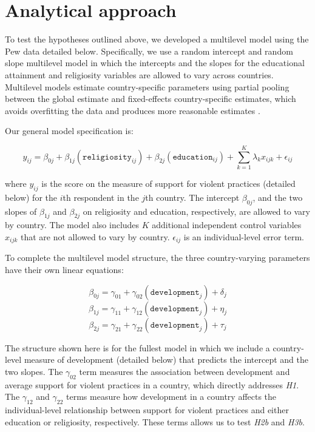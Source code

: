 \documentclass[10pt,letterpaper]{article}
\begin{document}
\section*{Analytical approach}

To test the hypotheses outlined above, we developed a multilevel model using the Pew data detailed below. Specifically, we use a random intercept and random slope multilevel model in which the intercepts and the slopes for the educational attainment and religiosity variables are allowed to vary across countries. Multilevel models estimate country-specific parameters using partial pooling between the global estimate and fixed-effects country-specific estimates, which avoids overfitting the data and produces more reasonable estimates \cite{gelman_multilevel_2006}.

Our general model specification is:

\[y_{ij}=\beta_{0j}+\beta_{1j}(\texttt{religiosity}_{ij})+\beta_{2j}(\texttt{education}_{ij})+\sum_{k=1}^K \lambda_kx_{ijk}+\epsilon_{ij}\]

where \(y_{ij}\) is the score on the measure of support for violent practices (detailed below) for the \(i\)th respondent in the \(j\)th country. The intercept \(\beta_{0j}\), and the two slopes of \(\beta_{1j}\) and \(\beta_{2j}\) on religiosity and education, respectively, are allowed to vary by country. The model also includes \(K\) additional independent control variables \(x_{ijk}\) that are not allowed to vary by country. \(\epsilon_{ij}\) is an individual-level error term.

To complete the multilevel model structure, the three country-varying parameters have their own linear equations:

\[\beta_{0j}=\gamma_{01}+\gamma_{02}(\texttt{development}_j)+\delta_j\]
\[\beta_{1j}=\gamma_{11}+\gamma_{12}(\texttt{development}_j)+\eta_j\]
\[\beta_{2j}=\gamma_{21}+\gamma_{22}(\texttt{development}_j)+\tau_j\]

The structure shown here is for the fullest model in which we include a country-level measure of development (detailed below) that predicts the intercept and the two slopes. The \(\gamma_{02}\) term measures the association between development and average support for violent practices in a country, which directly addresses \emph{H1}. The \(\gamma_{12}\) and \(\gamma_{22}\) terms measure how development in a country affects the individual-level relationship between support for violent practices and either education or religiosity, respectively. These terms allows us to test \emph{H2b} and \emph{H3b}.
\end{document}
